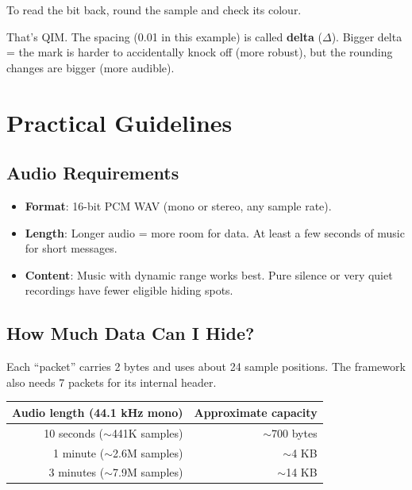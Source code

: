 \documentclass[11pt,a4paper]{article}
\begin{document}
To read the bit back, round the sample and check its colour.

That's QIM.  The spacing (0.01 in this example) is called \textbf{delta}
($\Delta$).  Bigger delta = the mark is harder to accidentally knock off
(more robust), but the rounding changes are bigger (more audible).


\section{Practical Guidelines}

\subsection{Audio Requirements}

\begin{itemize}
    \item \textbf{Format}: 16-bit PCM WAV (mono or stereo, any sample rate).
    \item \textbf{Length}: Longer audio = more room for data.
          At least a few seconds of music for short messages.
    \item \textbf{Content}: Music with dynamic range works best.
          Pure silence or very quiet recordings have fewer eligible
          hiding spots.
\end{itemize}

\subsection{How Much Data Can I Hide?}

Each ``packet'' carries 2 bytes and uses about 24 sample positions.
The framework also needs 7 packets for its internal header.

\begin{center}
\begin{tabular}{@{}rr@{}}
\toprule
Audio length (44.1 kHz mono) & Approximate capacity \\
\midrule
10 seconds ($\sim$441K samples) & $\sim$700 bytes \\
1 minute ($\sim$2.6M samples) & $\sim$4 KB \\
3 minutes ($\sim$7.9M samples) & $\sim$14 KB \\
\bottomrule
\end{tabular}
\end{center}
\end{document}
